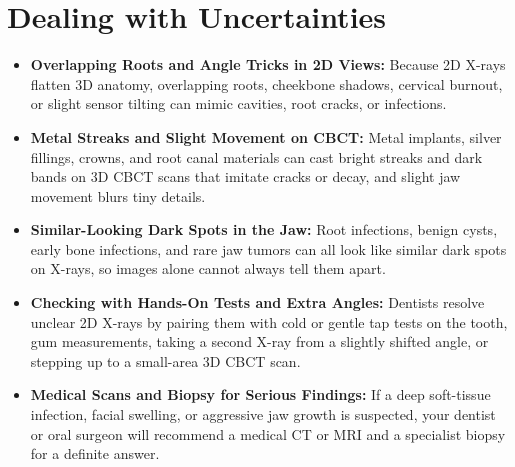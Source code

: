 \section{Dealing with Uncertainties}
\begin{itemize}
\item \textbf{Overlapping Roots and Angle Tricks in 2D Views:} Because 2D X-rays flatten 3D anatomy, overlapping roots, cheekbone shadows, cervical burnout, or slight sensor tilting can mimic cavities, root cracks, or infections.
\item \textbf{Metal Streaks and Slight Movement on CBCT:} Metal implants, silver fillings, crowns, and root canal materials can cast bright streaks and dark bands on 3D CBCT scans that imitate cracks or decay, and slight jaw movement blurs tiny details.
\item \textbf{Similar-Looking Dark Spots in the Jaw:} Root infections, benign cysts, early bone infections, and rare jaw tumors can all look like similar dark spots on X-rays, so images alone cannot always tell them apart.
\item \textbf{Checking with Hands-On Tests and Extra Angles:} Dentists resolve unclear 2D X-rays by pairing them with cold or gentle tap tests on the tooth, gum measurements, taking a second X-ray from a slightly shifted angle, or stepping up to a small-area 3D CBCT scan.
\item \textbf{Medical Scans and Biopsy for Serious Findings:} If a deep soft-tissue infection, facial swelling, or aggressive jaw growth is suspected, your dentist or oral surgeon will recommend a medical CT or MRI and a specialist biopsy for a definite answer.
\end{itemize}

